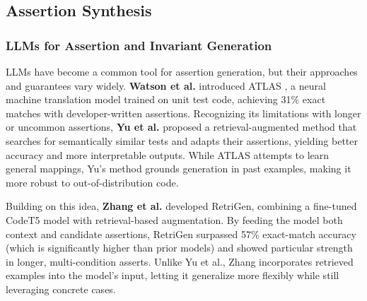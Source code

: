 \documentclass[8pt]{extarticle}
\begin{document}


\subsection{Assertion Synthesis}

\subsubsection{LLMs for Assertion and Invariant Generation}

LLMs have become a common tool for assertion generation, but their approaches and guarantees vary widely. \textbf{Watson et al.} introduced ATLAS \cite{watson2020}, a neural machine translation model trained on unit test code, achieving 31\% exact matches with developer-written assertions. Recognizing its limitations with longer or uncommon assertions, \textbf{Yu et al.} \cite{yu2022} proposed a retrieval-augmented method that searches for semantically similar tests and adapts their assertions, yielding better accuracy and more interpretable outputs. While ATLAS attempts to learn general mappings, Yu's method grounds generation in past examples, making it more robust to out-of-distribution code.

Building on this idea, \textbf{Zhang et al.} \cite{zhang2024} developed RetriGen, combining a fine-tuned CodeT5 model with retrieval-based augmentation. By feeding the model both context and candidate assertions, RetriGen surpassed 57\% exact-match accuracy (which is significantly higher than prior models) and showed particular strength in longer, multi-condition asserts. Unlike Yu et al., Zhang incorporates retrieved examples into the model's input, letting it generalize more flexibly while still leveraging concrete cases.
\end{document}
